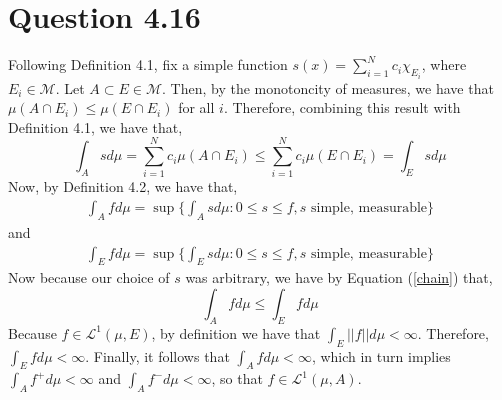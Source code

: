 \documentclass{article}
\begin{document}
  \section*{Question 4.16}
  Following Definition 4.1, fix a simple function $s(x) = \sum_{i=1}^{N} c_i \chi_{E_{i}}$, where $E_i \in \mathcal{M}$. Let $A \subset E \in \mathcal{M}$. Then, by the monotoncity of measures, we have that $\mu(A \cap E_i) \leq \mu(E \cap E_i)$ for all $i$. Therefore, combining this result with Definition 4.1, we have that,
  \begin{equation} \label{chain}
  	\int_A  sd\mu = \sum_{i=1}^{N} c_i \mu(A \cap E_i) \leq \sum_{i=1}^{N} c_i \mu(E \cap E_i) = \int_E s d\mu
  \end{equation}
  Now, by Definition 4.2, we have that,
  \begin{align*}
  	\int_A f d\mu = \sup \{ \int_A s d\mu : 0 \leq s \leq f, s \text{ simple, measurable}  \}
  \end{align*}
  and
  \begin{align*}
  	\int_E f d\mu = \sup \{ \int_E s d\mu : 0 \leq s \leq f, s \text{ simple, measurable}  \}
  \end{align*}
  Now because our choice of $s$ was arbitrary, we have by Equation (\ref{chain}) that,
  \begin{equation}
   \int_A f d\mu \leq \int_E f d\mu
  \end{equation}
  Because $f \in \mathscr{L}^1(\mu, E)$, by definition we have that $\int_E ||f|| d\mu < \infty$. Therefore, $\int_E f d\mu <\infty$. Finally, it follows that $\int_A f d\mu < \infty$, which in turn implies $\int_A f^+ d\mu < \infty$ and $\int_A f^{-} d\mu < \infty$, so that $f \in \mathscr{L}^1 (\mu, A)$.
\end{document}
